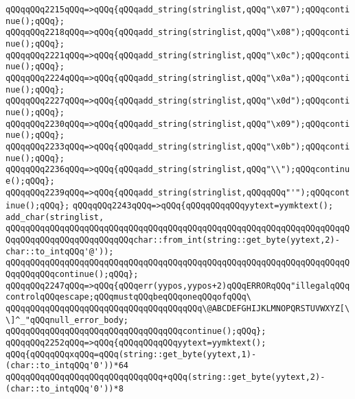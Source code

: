 \verb|qQQqqQQq2215qQQq=>qQQq{qQQqadd_string(stringlist,qQQq"\x07");qQQqcontinue();qQQq};|\newline
\verb|qQQqqQQq2218qQQq=>qQQq{qQQqadd_string(stringlist,qQQq"\x08");qQQqcontinue();qQQq};|\newline
\verb|qQQqqQQq2221qQQq=>qQQq{qQQqadd_string(stringlist,qQQq"\x0c");qQQqcontinue();qQQq};|\newline
\verb|qQQqqQQq2224qQQq=>qQQq{qQQqadd_string(stringlist,qQQq"\x0a");qQQqcontinue();qQQq};|\newline
\verb|qQQqqQQq2227qQQq=>qQQq{qQQqadd_string(stringlist,qQQq"\x0d");qQQqcontinue();qQQq};|\newline
\verb|qQQqqQQq2230qQQq=>qQQq{qQQqadd_string(stringlist,qQQq"\x09");qQQqcontinue();qQQq};|\newline
\verb|qQQqqQQq2233qQQq=>qQQq{qQQqadd_string(stringlist,qQQq"\x0b");qQQqcontinue();qQQq};|\newline
\verb|qQQqqQQq2236qQQq=>qQQq{qQQqadd_string(stringlist,qQQq"\\");qQQqcontinue();qQQq};|\newline
\verb|qQQqqQQq2239qQQq=>qQQq{qQQqadd_string(stringlist,qQQqqQQq"'");qQQqcontinue();qQQq};|\newline
\verb|qQQqqQQq2243qQQq=>qQQq{qQQqqQQqqQQqyytext=yymktext();|\newline
\verb|add_char(stringlist,|\newline
\verb|qQQqqQQqqQQqqQQqqQQqqQQqqQQqqQQqqQQqqQQqqQQqqQQqqQQqqQQqqQQqqQQqqQQqqQQqqQQqqQQqqQQqqQQqqQQqqQQqchar::from_int(string::get_byte(yytext,2)-char::to_intqQQq'@'));|\newline
\verb|qQQqqQQqqQQqqQQqqQQqqQQqqQQqqQQqqQQqqQQqqQQqqQQqqQQqqQQqqQQqqQQqqQQqqQQqqQQqqQQqcontinue();qQQq};|\newline
\verb|qQQqqQQq2247qQQq=>qQQq{qQQqerr(yypos,yypos+2)qQQqERRORqQQq"illegalqQQqcontrolqQQqescape;qQQqmustqQQqbeqQQqoneqQQqofqQQq\|\newline
\verb|qQQqqQQqqQQqqQQqqQQqqQQqqQQqqQQqqQQqqQQq\@ABCDEFGHIJKLMNOPQRSTUVWXYZ[\\]^_"qQQqnull_error_body;|\newline
\verb|qQQqqQQqqQQqqQQqqQQqqQQqqQQqqQQqqQQqcontinue();qQQq};|\newline
\verb|qQQqqQQq2252qQQq=>qQQq{qQQqqQQqqQQqyytext=yymktext();|\newline
\verb|qQQq{qQQqqQQqxqQQq=qQQq(string::get_byte(yytext,1)-(char::to_intqQQq'0'))*64|\newline
\verb|qQQqqQQqqQQqqQQqqQQqqQQqqQQqqQQq+qQQq(string::get_byte(yytext,2)-(char::to_intqQQq'0'))*8|\newline
